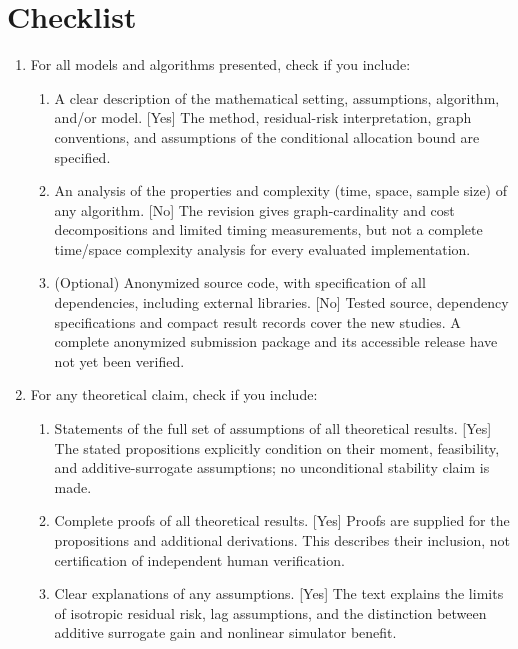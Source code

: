 \section*{Checklist}

\begin{enumerate}

  \item For all models and algorithms presented, check if you include:
  \begin{enumerate}
    \item A clear description of the mathematical setting, assumptions, algorithm, and/or model. [Yes] The method, residual-risk interpretation, graph conventions, and assumptions of the conditional allocation bound are specified.
    \item An analysis of the properties and complexity (time, space, sample size) of any algorithm. [No] The revision gives graph-cardinality and cost decompositions and limited timing measurements, but not a complete time/space complexity analysis for every evaluated implementation.
    \item (Optional) Anonymized source code, with specification of all dependencies, including external libraries. [No] Tested source, dependency specifications and compact result records cover the new studies. A complete anonymized submission package and its accessible release have not yet been verified.
  \end{enumerate}

  \item For any theoretical claim, check if you include:
  \begin{enumerate}
    \item Statements of the full set of assumptions of all theoretical results. [Yes] The stated propositions explicitly condition on their moment, feasibility, and additive-surrogate assumptions; no unconditional stability claim is made.
    \item Complete proofs of all theoretical results. [Yes] Proofs are supplied for the propositions and additional derivations. This describes their inclusion, not certification of independent human verification.
    \item Clear explanations of any assumptions. [Yes] The text explains the limits of isotropic residual risk, lag assumptions, and the distinction between additive surrogate gain and nonlinear simulator benefit.
  \end{enumerate}


\end{enumerate}
